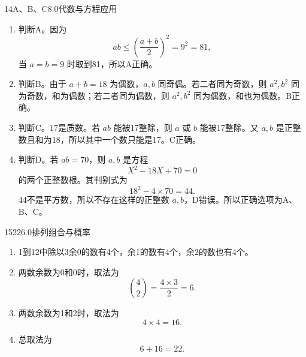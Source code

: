 \begin{solution}{14}{A、B、C}{8.0}{代数与方程应用}
\begin{enumerate}[label=\textbf{Step \arabic*:},leftmargin=*]
  \item 判断A。因为
  \[
    ab\le\left(\frac{a+b}{2}\right)^2=9^2=81,
  \]
  当 \(a=b=9\) 时取到81，所以A正确。
  \item 判断B。由于 \(a+b=18\) 为偶数，\(a,b\) 同奇偶。若二者同为奇数，则 \(a^2,b^2\) 同为奇数，和为偶数；若二者同为偶数，则 \(a^2,b^2\) 同为偶数，和也为偶数。B正确。
  \item 判断C。17是质数。若 \(ab\) 能被17整除，则 \(a\) 或 \(b\) 能被17整除。又 \(a,b\) 是正整数且和为18，所以其中一个数只能是17。C正确。
  \item 判断D。若 \(ab=70\)，则 \(a,b\) 是方程
  \[
    X^2-18X+70=0
  \]
  的两个正整数根。其判别式为
  \[
    18^2-4\times70=44.
  \]
  44不是平方数，所以不存在这样的正整数 \(a,b\)，D错误。所以正确选项为A、B、C。
\end{enumerate}
\end{solution}


\begin{solution}{15}{22}{6.0}{排列组合与概率}
\begin{enumerate}[label=\textbf{Step \arabic*:},leftmargin=*]
  \item 1到12中除以3余0的数有4个，余1的数有4个，余2的数也有4个。
  \item 两数余数为0和0时，取法为
  \[
    \binom42=\frac{4\times3}{2}=6.
  \]
  \item 两数余数为1和2时，取法为
  \[
    4\times4=16.
  \]
  \item 总取法为
  \[
    6+16=22.
  \]
\end{enumerate}
\end{solution}

